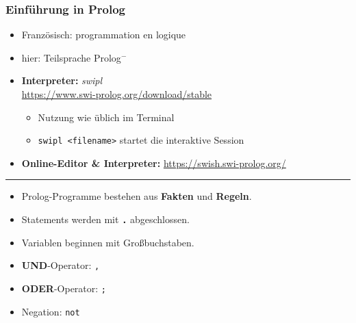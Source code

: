 \documentclass{beamer}
\renewcommand{\emph}[1]{\textbf{#1}}
\begin{document}
\begin{frame} \frametitle{Einführung in Prolog}
	\footnotesize
	\begin{itemize}
		\item Französisch: programmation en logique 
		\item hier: Teilsprache Prolog${}^-$
		\item \textbf{Interpreter:} \textit{swipl} \\ \url{https://www.swi-prolog.org/download/stable}
		\begin{itemize} \footnotesize
			\item Nutzung wie üblich im Terminal
			\item \texttt{swipl <filename>} startet die interaktive Session
		\end{itemize}
		\item \textbf{Online-Editor \& Interpreter:} \url{https://swish.swi-prolog.org/}
	\end{itemize}
	
	\bigskip \pause \hrule \medskip
	
	\begin{itemize}		
		\item Prolog-Programme bestehen aus \emph{Fakten} und \emph{Regeln}.
		\bigskip
		\item Statements werden mit \emph{\texttt{.}} abgeschlossen.
		\item Variablen beginnen mit Großbuchstaben.
		\bigskip
		\item \emph{UND}-Operator: \hspace{.25cm} \texttt{,}
		\item \emph{ODER}-Operator:\hspace{.2cm} \texttt{;}
		\item Negation: \hspace{1.15cm} \texttt{not}
	\end{itemize}
\end{frame}
\end{document}
